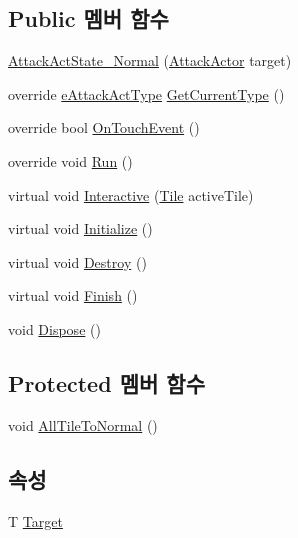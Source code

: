\subsection*{Public 멤버 함수}
\begin{DoxyCompactItemize}
\item 
\hyperlink{class_attack_actor_1_1_attack_act_state___normal_ab68b0ac3deec2c36e132dd8d635eef94}{Attack\+Act\+State\+\_\+\+Normal} (\hyperlink{class_attack_actor}{Attack\+Actor} target)
\item 
override \hyperlink{_attack_actor_8cs_a10659ce944335df4ded984f6bc41f31b}{e\+Attack\+Act\+Type} \hyperlink{class_attack_actor_1_1_attack_act_state___normal_a82484dc7be509e6a7a761c3c2b24a64a}{Get\+Current\+Type} ()
\item 
override bool \hyperlink{class_attack_actor_1_1_attack_act_state___normal_ac68685fce5e63f5b1d5fc3e8e74a5621}{On\+Touch\+Event} ()
\item 
override void \hyperlink{class_attack_actor_1_1_attack_act_state___normal_a7d6644fed269325b8f62138d8adb50f5}{Run} ()
\item 
virtual void \hyperlink{class_attack_actor_1_1_attack_act_state_a2ae9dd2f7ec8db76d25d7ad7ed58b89d}{Interactive} (\hyperlink{class_tile}{Tile} active\+Tile)
\item 
virtual void \hyperlink{class_m_c_n_1_1_state_a8eabaffe047e6dccd5c5d8aed7bf218a}{Initialize} ()
\item 
virtual void \hyperlink{class_m_c_n_1_1_state_a32af22a6a0a979d3b3a80225426aa839}{Destroy} ()
\item 
virtual void \hyperlink{class_m_c_n_1_1_state_a6de4f94b23916fcd05f589759da9ac3f}{Finish} ()
\item 
void \hyperlink{class_m_c_n_1_1_state_a6c53b2eda47e718ff469fd76a95cf02a}{Dispose} ()
\end{DoxyCompactItemize}
\subsection*{Protected 멤버 함수}
\begin{DoxyCompactItemize}
\item 
void \hyperlink{class_attack_actor_1_1_attack_act_state_a993762ec959af926e416f03fa7b71203}{All\+Tile\+To\+Normal} ()
\end{DoxyCompactItemize}
\subsection*{속성}
\begin{DoxyCompactItemize}
\item 
T \hyperlink{class_m_c_n_1_1_state_a93ba2fd920292031bd6e65b1dc505cb3}{Target}
\end{DoxyCompactItemize}



